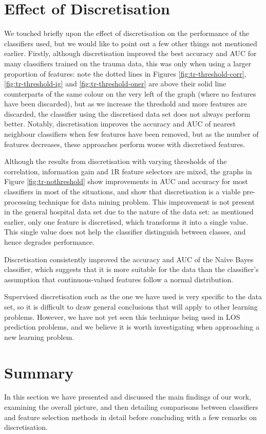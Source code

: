 \section{Effect of Discretisation}
We touched briefly upon the effect of discretisation on the performance of the
classifiers used, but we would like to point out a few other things not
mentioned earlier. Firstly,
although discretisation improved the best accuracy and AUC for many
classifiers trained on the trauma data, this was only when using a larger
proportion of features: note the dotted lines in
Figures \ref{fig:tr-threshold-corr}, \ref{fig:tr-threshold-ig} and
\ref{fig:tr-threshold-oner} are above their solid line counterparts of the
same colour on the very left of the graph (where no features have been
discarded), but as we increase the threshold and more features are discarded,
the classifier using the discretised data set does not always perform better.
Notably, discretisation improves the accuracy and AUC of nearest neighbour
classifiers when few features have been removed, but as the number of features
decreases, these approaches perform worse with discretised features.

Although the results from discretisation with varying thresholds of the
correlation, information gain and 1R feature selectors are mixed, the graphs
in Figure \ref{fig:tr-nothreshold} show improvements in AUC and accuracy for
most classifiers in most of the situations, and show that discretisation is a
viable pre-processing technique for data mining problem. This improvement is
not present in the general hospital data set due to the nature of the data set:
as mentioned earlier, only one feature is discretised, which transforms it into
a single value. This single value does not help the classifier distinguish
between classes, and hence degrades performance.

Discretisation consistently improved the accuracy and AUC of the Na\"{i}ve
Bayes classifier, which suggests that it is more suitable for the data than the
classifier's assumption that continuous-valued features follow a normal
distribution.

Supervised discretisation such as the one we have used is very specific to the
data set, so it is difficult to draw general conclusions that will apply to
other learning problems. However, we have not yet seen this technique being
used in LOS prediction problems, and we believe it is worth investigating
when approaching a new learning problem.

\section{Summary}
In this section we have presented and discussed the main findings of our
work, examining the overall picture, and then detailing comparisons between
classifiers and feature selection methods in detail before concluding with a
few remarks on discretisation.

